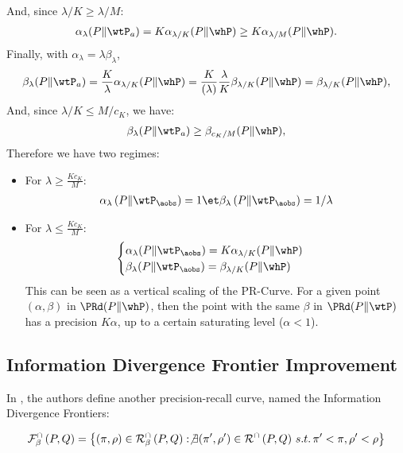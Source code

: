 \documentclass[twoside]{article}
\begin{document}
And, since $\lambda/K\geq \lambda/M$:
\begin{align}
    \alpha_\lambda(P\Vert \wtP_a)=  K\alpha_{\lambda/K}(P\Vert \whP)\geq  K\alpha_{\lambda/M}(P\Vert \whP).
\end{align}
Finally, with $\alpha_\lambda = \lambda \beta_\lambda $, 
\begin{align}
    \beta_\lambda(P\Vert \wtP_a) = \frac{K}{\lambda}\alpha_{\lambda/K}(P\Vert \whP) = \frac{K}{(\lambda)}\frac{\lambda}{K}\beta_{\lambda/K}(P\Vert \whP) = \beta_{\lambda/K}(P\Vert \whP), 
\end{align}
And, since $\lambda/K\leq M/c_K$, we have:
\begin{align}
    \beta_\lambda(P\Vert \wtP_a)\geq \beta_{c_K/M}(P\Vert \whP), 
\end{align}
Therefore we have two regimes:
\begin{itemize}
    \item For $\lambda\geq \frac{Kc_K}{M}$:
    \begin{align*}
        \alpha_\lambda \left(P\Vert \wtP_{\aobs}\right) = 1 \et
        \beta_\lambda \left(P\Vert \wtP_{\aobs}\right) = 1/\lambda
    \end{align*}
    \item For $\lambda\leq \frac{Kc_K}{M}$:
    \begin{align*}
    \begin{cases}
    \alpha_\lambda(P\Vert \wtP_{\aobs})= K \alpha_{\lambda/K}(P\Vert \whP) \\
        \beta_\lambda(P\Vert \wtP_{\aobs})=  \beta_{\lambda/K}(P\Vert \whP)
    \end{cases}
    \end{align*}
    This can be seen as a vertical scaling of the PR-Curve. For a given point $(\alpha, \beta)$ in $\PRd(P\Vert \whP)$, then the point with the same $\beta$ in  $\PRd(P\Vert \wtP)$ has a precision $K\alpha$, up to a certain saturating level ($\alpha<1$). 
\end{itemize}\newpage


\subsection{Information Divergence Frontier Improvement}\label{app:sec:djolonga}

In \cite{djolonga_precision-recall_2020}, the authors  define another precision-recall curve, named the Information Divergence Frontiers:

\[
\mathcal{F}_{\beta}^{\cap}\left(P,Q\right)=\left\{ (\pi,\rho)\in\mathcal{R}_{\beta}^{\cap}\left(P,Q\right):\not\exists(\pi',\rho')\in\mathcal{R}^{\cap}\left(P,Q\right)\,s.t.\,\text{\ensuremath{\pi'<\pi,\rho'<\rho}}\right\} 
\]
\end{document}
